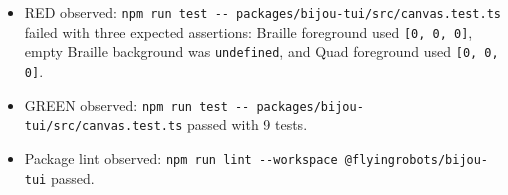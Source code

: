 \begin{itemize}
\tightlist
\item
  RED observed: \texttt{n\allowbreak{}p\allowbreak{}m\allowbreak{} \allowbreak{}r\allowbreak{}u\allowbreak{}n\allowbreak{} \allowbreak{}t\allowbreak{}e\allowbreak{}s\allowbreak{}t\allowbreak{} \allowbreak{}-\allowbreak{}-\allowbreak{} \allowbreak{}p\allowbreak{}a\allowbreak{}c\allowbreak{}k\allowbreak{}a\allowbreak{}g\allowbreak{}e\allowbreak{}s\allowbreak{}/\allowbreak{}b\allowbreak{}i\allowbreak{}j\allowbreak{}o\allowbreak{}u\allowbreak{}-\allowbreak{}t\allowbreak{}u\allowbreak{}i\allowbreak{}/\allowbreak{}s\allowbreak{}r\allowbreak{}c\allowbreak{}/\allowbreak{}c\allowbreak{}a\allowbreak{}n\allowbreak{}v\allowbreak{}a\allowbreak{}s\allowbreak{}.\allowbreak{}t\allowbreak{}e\allowbreak{}s\allowbreak{}t\allowbreak{}.\allowbreak{}t\allowbreak{}s} failed with three expected assertions: Braille foreground used \texttt{[\allowbreak{}0\allowbreak{},\allowbreak{} \allowbreak{}0\allowbreak{},\allowbreak{} \allowbreak{}0\allowbreak{}]}, empty Braille background was \texttt{u\allowbreak{}n\allowbreak{}d\allowbreak{}e\allowbreak{}f\allowbreak{}i\allowbreak{}n\allowbreak{}e\allowbreak{}d}, and Quad foreground used \texttt{[\allowbreak{}0\allowbreak{},\allowbreak{} \allowbreak{}0\allowbreak{},\allowbreak{} \allowbreak{}0\allowbreak{}]}.
\item
  GREEN observed: \texttt{n\allowbreak{}p\allowbreak{}m\allowbreak{} \allowbreak{}r\allowbreak{}u\allowbreak{}n\allowbreak{} \allowbreak{}t\allowbreak{}e\allowbreak{}s\allowbreak{}t\allowbreak{} \allowbreak{}-\allowbreak{}-\allowbreak{} \allowbreak{}p\allowbreak{}a\allowbreak{}c\allowbreak{}k\allowbreak{}a\allowbreak{}g\allowbreak{}e\allowbreak{}s\allowbreak{}/\allowbreak{}b\allowbreak{}i\allowbreak{}j\allowbreak{}o\allowbreak{}u\allowbreak{}-\allowbreak{}t\allowbreak{}u\allowbreak{}i\allowbreak{}/\allowbreak{}s\allowbreak{}r\allowbreak{}c\allowbreak{}/\allowbreak{}c\allowbreak{}a\allowbreak{}n\allowbreak{}v\allowbreak{}a\allowbreak{}s\allowbreak{}.\allowbreak{}t\allowbreak{}e\allowbreak{}s\allowbreak{}t\allowbreak{}.\allowbreak{}t\allowbreak{}s} passed with 9 tests.
\item
  Package lint observed: \texttt{n\allowbreak{}p\allowbreak{}m\allowbreak{} \allowbreak{}r\allowbreak{}u\allowbreak{}n\allowbreak{} \allowbreak{}l\allowbreak{}i\allowbreak{}n\allowbreak{}t\allowbreak{} \allowbreak{}-\allowbreak{}-\allowbreak{}w\allowbreak{}o\allowbreak{}r\allowbreak{}k\allowbreak{}s\allowbreak{}p\allowbreak{}a\allowbreak{}c\allowbreak{}e\allowbreak{} \allowbreak{}@\allowbreak{}f\allowbreak{}l\allowbreak{}y\allowbreak{}i\allowbreak{}n\allowbreak{}g\allowbreak{}r\allowbreak{}o\allowbreak{}b\allowbreak{}o\allowbreak{}t\allowbreak{}s\allowbreak{}/\allowbreak{}b\allowbreak{}i\allowbreak{}j\allowbreak{}o\allowbreak{}u\allowbreak{}-\allowbreak{}t\allowbreak{}u\allowbreak{}i} passed.

\end{itemize}
